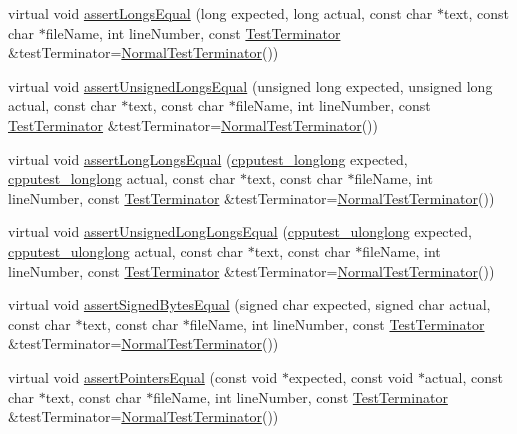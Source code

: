 \begin{DoxyCompactItemize}
\item 
virtual void \hyperlink{class_utest_shell_aa9675257925548a20a426cc32c6883c5}{assert\+Longs\+Equal} (long expected, long actual, const char $\ast$text, const char $\ast$file\+Name, int line\+Number, const \hyperlink{class_test_terminator}{Test\+Terminator} \&test\+Terminator=\hyperlink{class_normal_test_terminator}{Normal\+Test\+Terminator}())
\item 
virtual void \hyperlink{class_utest_shell_a5520c1138fffb8b742427512ba45f7c9}{assert\+Unsigned\+Longs\+Equal} (unsigned long expected, unsigned long actual, const char $\ast$text, const char $\ast$file\+Name, int line\+Number, const \hyperlink{class_test_terminator}{Test\+Terminator} \&test\+Terminator=\hyperlink{class_normal_test_terminator}{Normal\+Test\+Terminator}())
\item 
virtual void \hyperlink{class_utest_shell_a6e6e9c53326383b31d85583ccf4be4c3}{assert\+Long\+Longs\+Equal} (\hyperlink{structcpputest__longlong}{cpputest\+\_\+longlong} expected, \hyperlink{structcpputest__longlong}{cpputest\+\_\+longlong} actual, const char $\ast$text, const char $\ast$file\+Name, int line\+Number, const \hyperlink{class_test_terminator}{Test\+Terminator} \&test\+Terminator=\hyperlink{class_normal_test_terminator}{Normal\+Test\+Terminator}())
\item 
virtual void \hyperlink{class_utest_shell_ac4b53cc2ffb947f2e6ac8c19a531dfbb}{assert\+Unsigned\+Long\+Longs\+Equal} (\hyperlink{structcpputest__ulonglong}{cpputest\+\_\+ulonglong} expected, \hyperlink{structcpputest__ulonglong}{cpputest\+\_\+ulonglong} actual, const char $\ast$text, const char $\ast$file\+Name, int line\+Number, const \hyperlink{class_test_terminator}{Test\+Terminator} \&test\+Terminator=\hyperlink{class_normal_test_terminator}{Normal\+Test\+Terminator}())
\item 
virtual void \hyperlink{class_utest_shell_a74cb755b0e6c2186aa9735dc87e2d7ac}{assert\+Signed\+Bytes\+Equal} (signed char expected, signed char actual, const char $\ast$text, const char $\ast$file\+Name, int line\+Number, const \hyperlink{class_test_terminator}{Test\+Terminator} \&test\+Terminator=\hyperlink{class_normal_test_terminator}{Normal\+Test\+Terminator}())
\item 
virtual void \hyperlink{class_utest_shell_a511e5e49c21105966eee9f600a342455}{assert\+Pointers\+Equal} (const void $\ast$expected, const void $\ast$actual, const char $\ast$text, const char $\ast$file\+Name, int line\+Number, const \hyperlink{class_test_terminator}{Test\+Terminator} \&test\+Terminator=\hyperlink{class_normal_test_terminator}{Normal\+Test\+Terminator}())

\end{DoxyCompactItemize}
